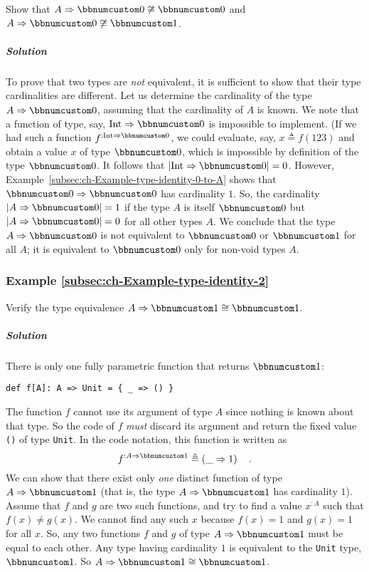 Show that $A\Rightarrow\bbnum 0\not\cong\bbnum 0$ and $A\Rightarrow\bbnum 0\not\cong\bbnum 1$.

\subparagraph{Solution}

To prove that two types are \emph{not} equivalent, it is sufficient
to show that their type cardinalities are different. Let us determine
the cardinality of the type $A\Rightarrow\bbnum 0$, assuming that
the cardinality of $A$ is known. We note that a function of type,
say, $\text{Int}\Rightarrow\bbnum 0$ is impossible to implement.
(If we had such a function $f^{:\text{Int}\Rightarrow\bbnum 0}$,
we could evaluate, say, $x\triangleq f(123)$ and obtain a value $x$
of type $\bbnum 0$, which is impossible by definition of the type
$\bbnum 0$. It follows that $\left|\text{Int}\Rightarrow\bbnum 0\right|=0$.
However, Example~\ref{subsec:ch-Example-type-identity-0-to-A} shows
that $\bbnum 0\Rightarrow\bbnum 0$ has cardinality $1$. So, the
cardinality $\left|A\Rightarrow\bbnum 0\right|=1$ if the type $A$
is itself $\bbnum 0$ but $\left|A\Rightarrow\bbnum 0\right|=0$ for
all other types $A$. We conclude that the type $A\Rightarrow\bbnum 0$
is not equivalent to $\bbnum 0$ or $\bbnum 1$ for all $A$; it is
equivalent to $\bbnum 0$ only for non-void types $A$.

\subsubsection{Example \label{subsec:ch-Example-type-identity-2}\ref{subsec:ch-Example-type-identity-2}}

Verify the type equivalence $A\Rightarrow\bbnum 1\cong\bbnum 1$.

\subparagraph{Solution}

There is only one fully parametric function that returns $\bbnum 1$:
\begin{lstlisting}
def f[A]: A => Unit = { _ => () }
\end{lstlisting}
The function $f$ cannot use its argument of type $A$ since nothing
is known about that type. So the code of $f$ \emph{must} discard
its argument and return the fixed value \lstinline!()! of type \lstinline!Unit!.
In the code notation, this function is written as
\[
f^{:A\Rightarrow\bbnum 1}\triangleq\left(\_\Rightarrow1\right)\quad.
\]
We can show that there exist only \emph{one} distinct function of
type $A\Rightarrow\bbnum 1$ (that is, the type $A\Rightarrow\bbnum 1$
has cardinality $1$). Assume that $f$ and $g$ are two such functions,
and try to find a value $x^{:A}$ such that $f(x)\neq g(x)$. We cannot
find any such $x$ because $f(x)=1$ and $g(x)=1$ for all $x$. So,
any two functions $f$ and $g$ of type $A\Rightarrow\bbnum 1$ must
be equal to each other. Any type having cardinality $1$ is equivalent
to the \lstinline!Unit! type, $\bbnum 1$. So $A\Rightarrow\bbnum 1\cong\bbnum 1$.

